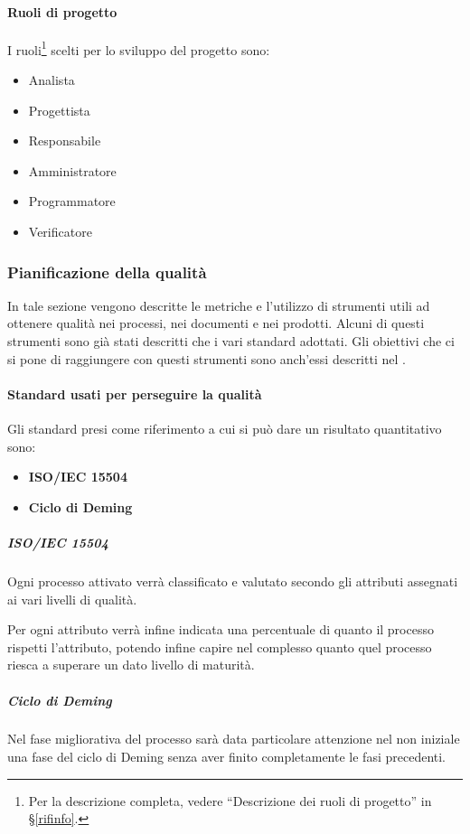 			\paragraph{Ruoli di progetto}
			I ruoli\footnote{Per la descrizione completa, vedere ``Descrizione dei ruoli di progetto'' in \S\ref{rifinfo}.} scelti per lo sviluppo del progetto sono:
			\begin{itemize}[noitemsep]
				\item Analista
				\item Progettista
				\item Responsabile
				\item Amministratore
				\item Programmatore
				\item Verificatore
			\end{itemize}


		\subsubsection{Pianificazione della qualità}
		In tale sezione vengono descritte le metriche e l'utilizzo di strumenti utili ad ottenere qualità nei processi, nei documenti e nei prodotti. Alcuni di questi strumenti sono già stati descritti \Doc{\PdQ} che i vari standard adottati. Gli obiettivi che ci si pone di raggiungere con questi strumenti sono anch'essi descritti nel \Doc{\PdQ}.
		
			\paragraph{Standard usati per perseguire la qualità}		
			Gli standard presi come riferimento a cui si può dare un risultato quantitativo sono:
			
			\begin{itemize}
				\item \textbf{ISO/IEC 15504}
				\item \textbf{Ciclo di Deming}
			\end{itemize}
		
				\subparagraph*{ISO/IEC 15504}
				Ogni processo attivato verrà classificato e valutato secondo gli attributi assegnati ai vari livelli di qualità.
				
				Per ogni attributo verrà infine indicata una percentuale di quanto il processo rispetti l'attributo, potendo infine capire nel complesso quanto quel processo riesca a superare un dato livello di maturità.
				
				\subparagraph*{Ciclo di Deming}
				Nel fase migliorativa del processo sarà data particolare attenzione nel non iniziale una fase del ciclo di Deming senza aver finito completamente le fasi precedenti.
			
